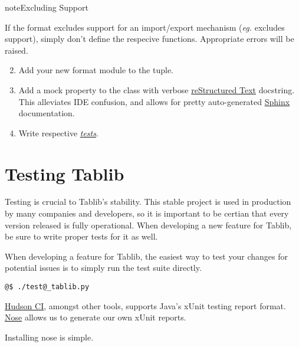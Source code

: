 \documentclass[a4paper,12pt,english]{sphinxmanual}
\begin{document}
\begin{notice}{note}{Excluding Support}

If the format excludes support for an import/export mechanism (\emph{eg.} {\hyperref[api:tablib.Dataset.csv]{}} excludes {\hyperref[api:tablib.Databook]{}} support), simply don't define the respecive functions. Appropriate errors will be raised.
\end{notice}
\begin{enumerate}
\setcounter{enumi}{1}
\item {} 
Add your new format module to the  tuple.

\item {} 
Add a mock property to the {\hyperref[api:tablib.Dataset]{}} class with verbose \href{http://docutils.sourceforge.net/rst.html}{reStructured Text} docstring. This alleviates IDE confusion, and allows for pretty auto-generated \href{http://sphinx.pocoo.org}{Sphinx} documentation.

\item {} 
Write respective {\hyperref[development:testing]{\emph{tests}}}.

\end{enumerate}


\section{Testing Tablib}
\label{development:testing}\label{development:testing-tablib}
Testing is crucial to Tablib's stability. This stable project is used in production by many companies and developers, so it is important to be certian that every version released is fully operational. When developing a new feature for Tablib, be sure to write proper tests for it as well.

When developing a feature for Tablib, the easiest way to test your changes for potential issues is to simply run the test suite directly.

\begin{Verbatim}[commandchars=@\[\]]
@$ ./test@_tablib.py
\end{Verbatim}

\href{http://hudson.dev.java.net}{Hudson CI}, amongst other tools, supports Java's xUnit testing report format. \href{http://somethingaboutorange.com/mrl/projects/nose/}{Nose} allows us to generate our own xUnit reports.

Installing nose is simple.
\end{document}
